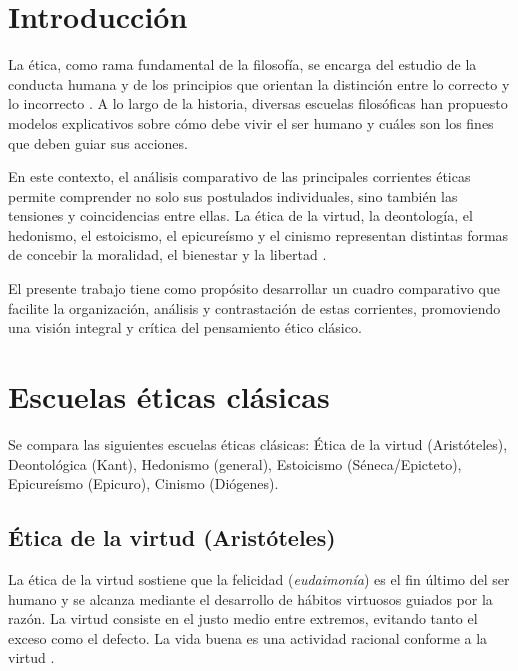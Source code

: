 \documentclass[
	spanish, %
	letterpaper, oneside
]{article}
\begin{document}
\templateIndex

\templateFinalcfg


\section{Introducción}

La ética, como rama fundamental de la filosofía, se encarga del estudio de la conducta humana y de los principios que orientan la distinción entre lo correcto y lo incorrecto \citep{ronquillo2018etica}. A lo largo de la historia, diversas escuelas filosóficas han propuesto modelos explicativos sobre cómo debe vivir el ser humano y cuáles son los fines que deben guiar sus acciones.

En este contexto, el análisis comparativo de las principales corrientes éticas permite comprender no solo sus postulados individuales, sino también las tensiones y coincidencias entre ellas. La ética de la virtud, la deontología, el hedonismo, el estoicismo, el epicureísmo y el cinismo representan distintas formas de concebir la moralidad, el bienestar y la libertad \citep{huerta2000etica}.

El presente trabajo tiene como propósito desarrollar un cuadro comparativo que facilite la organización, análisis y contrastación de estas corrientes, promoviendo una visión integral y crítica del pensamiento ético clásico.

\section{Escuelas éticas clásicas}

Se compara las siguientes escuelas éticas clásicas: Ética de la virtud (Aristóteles), Deontológica (Kant), Hedonismo (general), Estoicismo (Séneca/Epicteto), Epicureísmo (Epicuro), Cinismo (Diógenes).

\subsection*{Ética de la virtud (Aristóteles)}

La ética de la virtud sostiene que la felicidad (\textit{eudaimonía}) es el fin último del ser humano y se alcanza mediante el desarrollo de hábitos virtuosos guiados por la razón. La virtud consiste en el justo medio entre extremos, evitando tanto el exceso como el defecto. La vida buena es una actividad racional conforme a la virtud \citep{huerta2000etica}.
\end{document}
